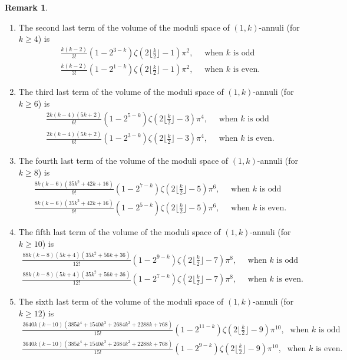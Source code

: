 \documentclass{amsart}
\theoremstyle{definition}
\newtheorem{remark}[proposition]{Remark}
\begin{document}
\begin{remark}
\begin{enumerate}
\item The second last term of the volume of the moduli space of $(1,k)$-annuli (for $k\geqslant 4$) is
    \begin{align*}
    \tfrac{k(k-2)}{3!}(1-2^{3-k})\zeta(2\lfloor \tfrac{k}{2}\rfloor-1)\pi^2,\quad \text{ when }k\text{ is odd}\\
    \tfrac{k(k-2)}{3!}(1-2^{1-k})\zeta(2\lfloor \tfrac{k}{2}\rfloor-1)\pi^2,\quad \text{ when }k\text{ is even.}
    \end{align*}
\item 
The third last term of the volume of the moduli space of $(1,k)$-annuli (for $k\geqslant 6$) is
    \begin{align*}
    \tfrac{2k(k-4)(5k+2)}{6!}(1-2^{5-k})\zeta(2\lfloor \tfrac{k}{2}\rfloor-3)\pi^4,\quad \text{ when }k\text{ is odd}\\
    \tfrac{2k(k-4)(5k+2)}{6!}(1-2^{3-k})\zeta(2\lfloor \tfrac{k}{2}\rfloor-3)\pi^4,\quad \text{ when }k\text{ is even.}
    \end{align*}
\item 
The fourth last term of the volume of the moduli space of $(1,k)$-annuli (for $k\geqslant 8$) is
    \begin{align*}
    \tfrac{8k(k-6)(35k^2+42k+16)}{9!}(1-2^{7-k})\zeta(2\lfloor \tfrac{k}{2}\rfloor-5)\pi^6,\quad \text{ when }k\text{ is odd}\\
    \tfrac{8k(k-6)(35k^2+42k+16)}{9!}(1-2^{5-k})\zeta(2\lfloor \tfrac{k}{2}\rfloor-5)\pi^6,\quad \text{ when }k\text{ is even.}
    \end{align*}
\item 
The fifth last term of the volume of the moduli space of $(1,k)$-annuli (for $k\geqslant 10$) is
    \begin{align*}
    \tfrac{88k(k-8)(5k+4)(35k^2+56k+36)}{12!}(1-2^{9-k})\zeta(2\lfloor \tfrac{k}{2}\rfloor-7)\pi^8,\quad \text{ when }k\text{ is odd}\\
    \tfrac{88k(k-8)(5k+4)(35k^2+56k+36)}{12!}(1-2^{7-k})\zeta(2\lfloor \tfrac{k}{2}\rfloor-7)\pi^8,\quad \text{ when }k\text{ is even.}
    \end{align*}
\item 
The sixth last term of the volume of the moduli space of $(1,k)$-annuli (for $k\geqslant 12$) is
    \begin{align*}
    \tfrac{3640k(k-10)(385k^4+1540k^3+2684k^2+2288k+768)}{15!}(1-2^{11-k})\zeta(2\lfloor \tfrac{k}{2}\rfloor-9)\pi^{10},\; \text{ when }k\text{ is odd}\\
    \tfrac{3640k(k-10)(385k^4+1540k^3+2684k^2+2288k+768)}{15!}(1-2^{9-k})\zeta(2\lfloor \tfrac{k}{2}\rfloor-9)\pi^{10},\; \text{ when }k\text{ is even.}
    \end{align*}
\end{enumerate}
\end{remark}
\medskip
\end{document}
